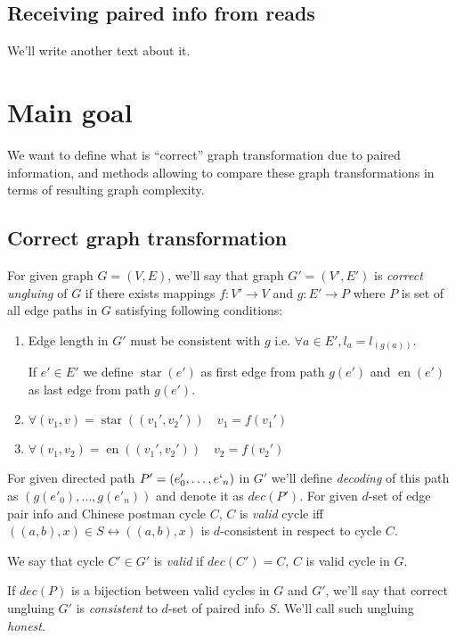 \documentclass[12pt,a4paper,oneside]{article}
\begin{document}
\subsection{Receiving paired info from reads}
We'll write another text about it.
\section{Main goal}
We want to define what is ``correct'' graph transformation due to paired information, and methods allowing to compare these graph transformations in terms of resulting graph complexity.

\subsection{Correct graph transformation}
For given graph $G=(V, E)$, we'll say that graph $G' = (V', E')$  is \emph{correct ungluing} of $G$ if there exists mappings $f: V' \rightarrow V$ and $g: E' \rightarrow P$ where $P$ is set of all edge paths in $G$
satisfying following conditions:
\begin{enumerate}

\item Edge length in $G'$ must be consistent with $g$ i.e. $\forall a\in E', l_a = l_{(g(a))}$. 

 If $e'\in E'$ we define $\mathop{start_e}(e')$ as first edge from path $g(e')$
 and $\mathop{end_e}(e')$ as last edge from path $g(e')$.


\item $\forall (v_1, v) = \mathop{start_e}((v_1', v_2')) \quad v_1 = f(v_1')$
\item $\forall (v_1, v_2) = \mathop{end_e}((v_1', v_2')) \quad v_2 = f(v_2')$
\end{enumerate}
For given directed path $P' = (e'_0, \ldots, e`_n)$ in $G' $ we'll define \emph{decoding} of this path as $(g(e'_0), \ldots, g(e'_n))$ and denote it as $dec(P')$.
For given $d$-set of edge pair info and Chinese postman cycle $C$, $C$ is \emph{valid} cycle iff $((a, b), x) \in S \leftrightarrow  ((a, b), x)$ is $d$-consistent in respect to cycle $C$.

We say that cycle $C' \in G'$ is \emph{valid} if $dec(C')=C$, $C$ is valid cycle in $G$.
  
If $dec(P)$ is a bijection between valid cycles in $G$ and $G'$, we'll say that correct ungluing $G'$ is \emph{consistent} to $d$-set of paired info $S$.
We'll call such ungluing \emph{honest}.
\end{document}
